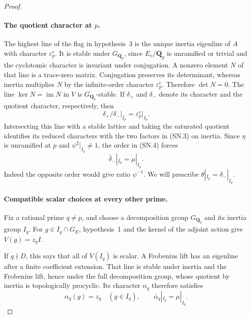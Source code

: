 \begin{proof}
\paragraph{The quotient character at $p$.}
The highest line of the flag in hypothesis~3 is the unique inertia
eigenline of $A$ with character $\varepsilon_p^e$.
It is stable under $G_{\mathbf Q_p}$, since $E_v/\mathbf Q_p$ is
unramified or trivial and the cyclotomic character is invariant
under conjugation.  A nonzero element $N$ of that line is a
trace-zero matrix.  Conjugation preserves its determinant,
whereas inertia multiplies $N$ by the infinite-order character
$\varepsilon_p^e$.  Therefore $\det N=0$.
The line $\ker N=\operatorname{im}N$ in $V$ is
$G_{\mathbf Q_p}$-stable.  If $\delta_+$ and $\delta_-$ denote
its character and the quotient character, respectively, then
\[
            \delta_+/\delta_-\big|_{I_p}
                        =\varepsilon_p^e\big|_{I_p}.     \tag{SN.4}
\]
Intersecting this line with a stable lattice and taking the
saturated quotient identifies its reduced characters with the
two factors in (SN.3) on inertia.  Since $\eta$ is unramified
at $p$ and $\psi^2|_{I_p}\ne1$, the order in (SN.4) forces
\[
                   \bar\delta_-|_{I_p}=\mu|_{I_p}.        \tag{SN.5}
\]
Indeed the opposite order would give ratio $\psi^{-1}$.
We will prescribe $\theta|_{I_p}=\delta_-|_{I_p}$.

\paragraph{Compatible scalar choices at every other prime.}
Fix a rational prime $q\ne p$, and choose a decomposition group
$G_{\mathbf Q_q}$ and its inertia group $I_q$.
For $g\in I_q\cap G_E$, hypothesis~1 and the kernel of the
adjoint action give $V(g)=z_g I$.

If $q\nmid D$, this says that all of $V(I_q)$ is scalar.
A Frobenius lift has an eigenline after a finite coefficient
extension.  That line is stable under inertia and the Frobenius
lift, hence under the full decomposition group, whose quotient
by inertia is topologically procyclic.  Its character
$\alpha_q$ therefore satisfies
\[
               \alpha_q(g)=z_g\quad(g\in I_q),
               \qquad \bar\alpha_q|_{I_q}=\mu|_{I_q}.     \tag{SN.6}
\]


\end{proof}
